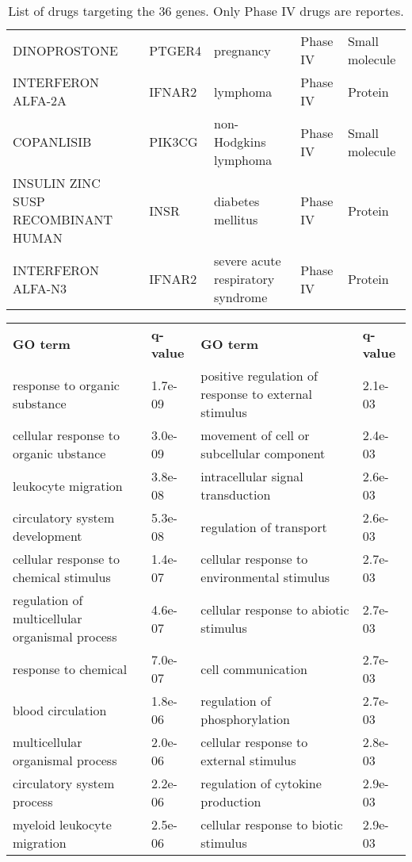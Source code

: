 \documentclass[fleqn,10pt]{SelfArx} %
\begin{document}
\begin{table}[ht]
\begin{tabularx}{\textwidth}{lXlll}
		DINOPROSTONE & PTGER4 & pregnancy & Phase IV & Small molecule \\ 
		INTERFERON ALFA-2A & IFNAR2 & lymphoma & Phase IV & Protein \\ 
		COPANLISIB & PIK3CG & non-Hodgkins lymphoma & Phase IV & Small molecule \\ 
		INSULIN ZINC SUSP RECOMBINANT HUMAN & INSR & diabetes mellitus & Phase IV & Protein \\ 
		INTERFERON ALFA-N3 & IFNAR2 & severe acute respiratory syndrome & Phase IV & Protein \\ 
	\end{tabularx}
	\smallskip
	\caption{List of drugs targeting the 36 genes. Only Phase IV drugs are reportes.}
	\label{tab:drugs}
\end{table}


\begin{table}[ht]
	\centering
	\scriptsize
	\begin{tabularx}{\textwidth}{XlXl}
		\rowcolor{NavyBlue!80}
		\textbf{\color{white} GO term} & \textbf{\color{white} q-value} & \textbf{\color{white} GO term} & \textbf{\color{white} q-value} \\
		response to organic substance & 1.7e-09 & positive regulation of response to external stimulus & 2.1e-03 \\ 
		cellular response to organic ubstance & 3.0e-09 & movement of cell or subcellular component & 2.4e-03 \\ 
		leukocyte migration & 3.8e-08 & intracellular signal transduction & 2.6e-03 \\ 
		circulatory system development & 5.3e-08 & regulation of transport & 2.6e-03 \\ 
		cellular response to chemical stimulus & 1.4e-07 & cellular response to environmental stimulus & 2.7e-03 \\ 
		regulation of multicellular organismal process & 4.6e-07 & cellular response to abiotic stimulus & 2.7e-03 \\ 
		response to chemical & 7.0e-07 & cell communication & 2.7e-03 \\ 
		blood circulation & 1.8e-06 & regulation of phosphorylation & 2.7e-03 \\ 
		multicellular organismal process & 2.0e-06 & cellular response to external stimulus & 2.8e-03 \\ 
		circulatory system process & 2.2e-06 & regulation of cytokine production & 2.9e-03 \\ 
		myeloid leukocyte migration & 2.5e-06 & cellular response to biotic stimulus & 2.9e-03 \\ 

\end{tabularx}
\end{table}
\end{document}
